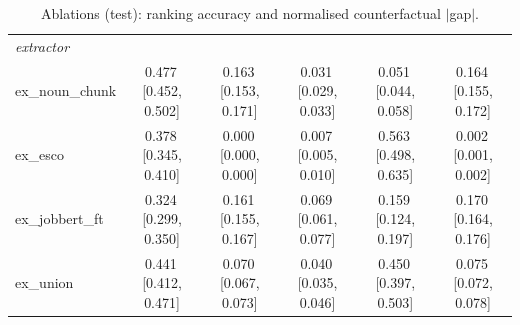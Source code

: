\begin{table}[t]
{\begin{tabular}{lccccc}
\midrule
\multicolumn{6}{l}{\textit{extractor}} \\
\quad ex\_noun\_chunk & 0.477\,{\scriptsize[0.452, 0.502]} & 0.163\,{\scriptsize[0.153, 0.171]} & 0.031\,{\scriptsize[0.029, 0.033]} & 0.051\,{\scriptsize[0.044, 0.058]} & 0.164\,{\scriptsize[0.155, 0.172]} \\
\quad ex\_esco & 0.378\,{\scriptsize[0.345, 0.410]} & 0.000\,{\scriptsize[0.000, 0.000]} & 0.007\,{\scriptsize[0.005, 0.010]} & 0.563\,{\scriptsize[0.498, 0.635]} & 0.002\,{\scriptsize[0.001, 0.002]} \\
\quad ex\_jobbert\_ft & 0.324\,{\scriptsize[0.299, 0.350]} & 0.161\,{\scriptsize[0.155, 0.167]} & 0.069\,{\scriptsize[0.061, 0.077]} & 0.159\,{\scriptsize[0.124, 0.197]} & 0.170\,{\scriptsize[0.164, 0.176]} \\
\quad ex\_union & 0.441\,{\scriptsize[0.412, 0.471]} & 0.070\,{\scriptsize[0.067, 0.073]} & 0.040\,{\scriptsize[0.035, 0.046]} & 0.450\,{\scriptsize[0.397, 0.503]} & 0.075\,{\scriptsize[0.072, 0.078]} \\
\bottomrule
\end{tabular}
}
\caption{Ablations (test): ranking accuracy and normalised counterfactual $|$gap$|$.}
\label{tab:ablations}
\end{table}
